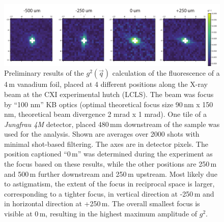 \vspace{-0.5cm}
\begin{figure}[H]
	\centering
	\includegraphics[width=\linewidth]{images/lv65_vanadium.pdf}	
	\caption[Focus finding using IDI]{Preliminary results of the $g^2(\vec{q})$ calculation of the fluorescence of a 4\,\textmu m vanadium foil, placed at 4 different positions along the X-ray beam at the CXI experimental hutch (LCLS). The beam was focus by \enquote{100 nm} KB optics (optimal theoretical focus size 90\,nm x 150\,nm, theoretical beam divergence 2 mrad x 1 mrad). One tile of a \textit{Jungfrau 4M} detector, placed 480\,mm downstream of the sample was used for the analysis. Shown are averages over 2000 shots with minimal shot-based filtering. The axes are in detector pixels. The position captioned \enquote{0\,\textmu m} was determined during the experiment as the focus based on these results, while the other positions are 250\,\textmu m and 500\,\textmu m further downstream and 250\,\textmu m upstream.  Most likely due to astigmatism, the extent of the focus in reciprocal space is larger, corresponding to a tighter focus, in vertical direction at -250\,\textmu m and in horizontal direction at +250\,\textmu m. The overall smallest focus is visible at 0\,\textmu m, resulting in the highest maximum amplitude of $g^2$.}
	\label{fig:outlook_vanadium}
\end{figure}

